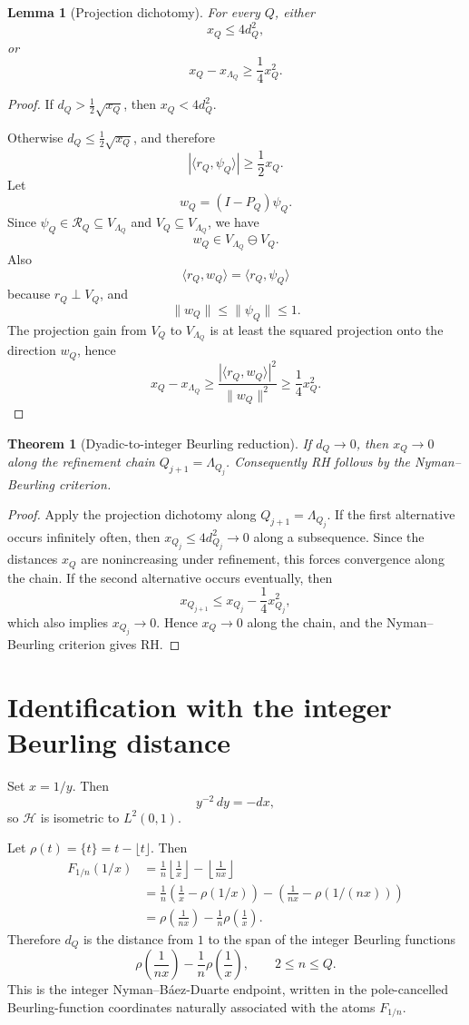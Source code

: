 \documentclass[11pt]{article}
\newtheorem{theorem}{Theorem}
\newtheorem{lemma}{Lemma}
\newcommand{\Hcal}{\mathcal H}
\newcommand{\Rcal}{\mathcal R}
\begin{document}
\begin{lemma}[Projection dichotomy]
For every $Q$, either
\[
x_Q\le 4d_Q^2,
\]
or
\[
x_Q-x_{\Lambda_Q}\ge \frac14 x_Q^2.
\]
\end{lemma}

\begin{proof}
If $d_Q>\frac12\sqrt{x_Q}$, then $x_Q<4d_Q^2$.

Otherwise $d_Q\le \frac12\sqrt{x_Q}$, and therefore
\[
|\langle r_Q,\psi_Q\rangle|\ge \frac12 x_Q.
\]
Let
\[
w_Q=(I-P_Q)\psi_Q.
\]
Since $\psi_Q\in\Rcal_Q\subseteq V_{\Lambda_Q}$ and $V_Q\subseteq V_{\Lambda_Q}$, we have
\[
w_Q\in V_{\Lambda_Q}\ominus V_Q.
\]
Also
\[
\langle r_Q,w_Q\rangle=\langle r_Q,\psi_Q\rangle
\]
because $r_Q\perp V_Q$, and
\[
\|w_Q\|\le\|\psi_Q\|\le1.
\]
The projection gain from $V_Q$ to $V_{\Lambda_Q}$ is at least the squared projection onto the direction $w_Q$, hence
\[
x_Q-x_{\Lambda_Q}\ge \frac{|\langle r_Q,w_Q\rangle|^2}{\|w_Q\|^2}\ge \frac14x_Q^2.
\]
\end{proof}

\begin{theorem}[Dyadic-to-integer Beurling reduction]
If $d_Q\to0$, then $x_Q\to0$ along the refinement chain $Q_{j+1}=\Lambda_{Q_j}$. Consequently RH follows by the Nyman--Beurling criterion.
\end{theorem}

\begin{proof}
Apply the projection dichotomy along $Q_{j+1}=\Lambda_{Q_j}$. If the first alternative occurs infinitely often, then $x_{Q_j}\le 4d_{Q_j}^2\to0$ along a subsequence. Since the distances $x_Q$ are nonincreasing under refinement, this forces convergence along the chain. If the second alternative occurs eventually, then
\[
x_{Q_{j+1}}\le x_{Q_j}-\frac14x_{Q_j}^2,
\]
which also implies $x_{Q_j}\to0$. Hence $x_Q\to0$ along the chain, and the Nyman--Beurling criterion gives RH.
\end{proof}

\section{Identification with the integer Beurling distance}

Set $x=1/y$. Then
\[
y^{-2}\,dy=-dx,
\]
so $\Hcal$ is isometric to $L^2(0,1)$.

Let $\rho(t)=\{t\}=t-\lfloor t\rfloor$. Then
\begin{align*}
F_{1/n}(1/x)
&=\frac1n\left\lfloor\frac1x\right\rfloor-\left\lfloor\frac1{nx}\right\rfloor\\
&=\frac1n\left(\frac1x-\rho(1/x)\right)-\left(\frac1{nx}-\rho(1/(nx))\right)\\
&=\rho\left(\frac1{nx}\right)-\frac1n\rho\left(\frac1x\right).
\end{align*}
Therefore $d_Q$ is the distance from $1$ to the span of the integer Beurling functions
\[
\rho\left(\frac1{nx}\right)-\frac1n\rho\left(\frac1x\right),\qquad 2\le n\le Q.
\]
This is the integer Nyman--Báez-Duarte endpoint, written in the pole-cancelled Beurling-function coordinates naturally associated with the atoms $F_{1/n}$.
\end{document}
